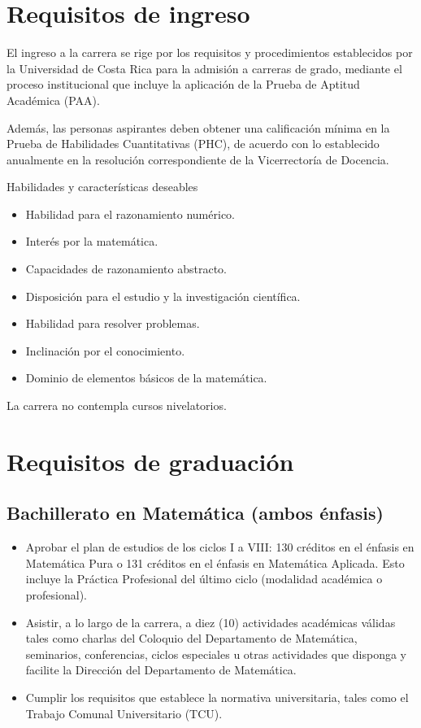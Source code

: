 \documentclass[11pt,a4paper]{article}
\begin{document}
\section{Requisitos de ingreso}

El ingreso a la carrera se rige por los requisitos y procedimientos establecidos por la Universidad de Costa Rica para la admisión a carreras de grado, mediante el proceso institucional que incluye la aplicación de la Prueba de Aptitud Académica (PAA).

Además, las personas aspirantes deben obtener una calificación mínima en la Prueba de Habilidades Cuantitativas (PHC), de acuerdo con lo establecido anualmente en la resolución correspondiente de la Vicerrectoría de Docencia.

Habilidades y características deseables
\begin{itemize}
    \item Habilidad para el razonamiento numérico.
    \item Interés por la matemática.
    \item Capacidades de razonamiento abstracto.
    \item Disposición para el estudio y la investigación científica.
    \item Habilidad para resolver problemas.
    \item Inclinación por el conocimiento.
    \item Dominio de elementos básicos de la matemática.
\end{itemize}

La carrera no contempla cursos nivelatorios.

\section{Requisitos de graduación}

\subsection*{Bachillerato en Matemática (ambos énfasis)}
\begin{itemize}
  \item Aprobar el plan de estudios de los ciclos I a VIII: 130 créditos en el énfasis en Matemática Pura o 131 créditos en el énfasis en Matemática Aplicada. Esto incluye la Práctica Profesional del último ciclo (modalidad académica o profesional).
  \item Asistir, a lo largo de la carrera, a diez (10) actividades académicas válidas tales como charlas del Coloquio del Departamento de Matemática, seminarios, conferencias, ciclos especiales u otras actividades que disponga y facilite la Dirección del Departamento de Matemática.
  \item Cumplir los requisitos que establece la normativa universitaria, tales como el Trabajo Comunal Universitario (TCU).
\end{itemize}
\end{document}
